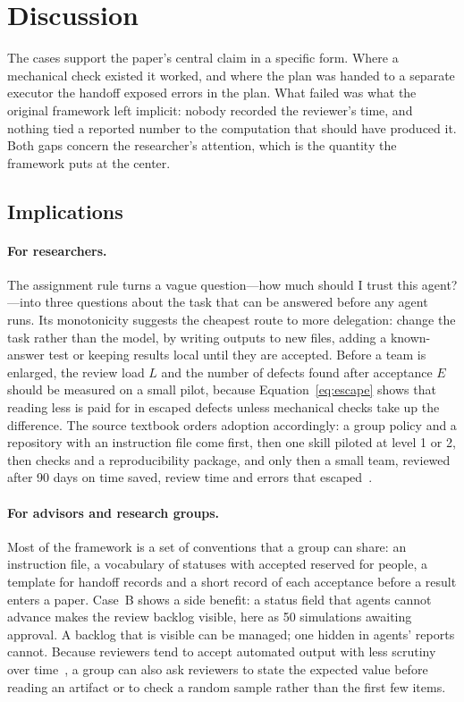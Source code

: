 \section{Discussion}
\label{sec:discussion}

The cases support the paper's central claim in a specific form. Where a mechanical check
existed it worked, and where the plan was handed to a separate executor the handoff
exposed errors in the plan. What failed was what the original framework left implicit:
nobody recorded the reviewer's time, and nothing tied a reported number to the
computation that should have produced it. Both gaps concern the researcher's attention,
which is the quantity the framework puts at the center.

\subsection{Implications}
\label{sec:implications}

\paragraph{For researchers.} The assignment rule turns a vague question---how much should
I trust this agent?---into three questions about the task that can be answered before
any agent runs. Its monotonicity suggests the cheapest route to more delegation: change
the task rather than the model, by writing outputs to new files, adding a known-answer
test or keeping results local until they are accepted. Before a team is enlarged, the
review load $L$ and the number of defects found after acceptance $E$ should be measured on
a small pilot, because Equation~\eqref{eq:escape} shows that reading less is paid for in
escaped defects unless mechanical checks take up the difference. The source textbook
orders adoption accordingly: a group policy and a repository with an instruction file
come first, then one skill piloted at level 1 or 2, then checks and a reproducibility
package, and only then a small team, reviewed after 90 days on time saved, review time
and errors that escaped~\cite{mccreary2026aiforee}.

\paragraph{For advisors and research groups.} Most of the framework is a set of
conventions that a group can share: an instruction file, a vocabulary of statuses with
\textsf{accepted} reserved for people, a template for handoff records and a short record
of each acceptance before a result enters a paper. Case~B shows a side benefit: a status
field that agents cannot advance makes the review backlog visible, here as 50 simulations
awaiting approval. A backlog that is visible can be managed; one hidden in agents'
reports cannot. Because reviewers tend to accept automated output with less scrutiny
over time~\cite{parasuraman2010complacency,goddard2012automation}, a group can also ask
reviewers to state the expected value before reading an artifact or to check a random
sample rather than the first few items.

